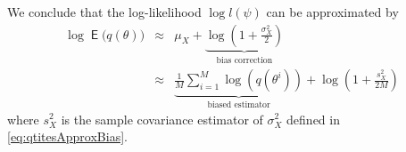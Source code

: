 \documentclass{article}
\DeclareMathOperator{\E}{\mathsf{E}}
\begin{document}
We conclude that the log-likelihood $\log l(\psi)$ can be approximated by
\begin{equation}
  \begin{array}{rcl}
   \log \E \Big ( q(\theta)  \Big ) & \approx & \mu_X + \underbrace{\log (1 + \frac{\sigma_X^2}{2})}_{\text{bias correction}} \\
     & \approx & \underbrace{ \frac{1}{M} \displaystyle \sum_{i=1}^M \log(q(\theta^i))}_{\text{biased estimator}} + \log (1 + \frac{s_X^2}{2M})
   \end{array}
   \label{eq:AppLogLikFinal}
\end{equation}
where $s_X^2$ is the sample covariance estimator of $\sigma^2_X$ defined in
\eqref{eq:qtitesApproxBias}.
\end{document}
